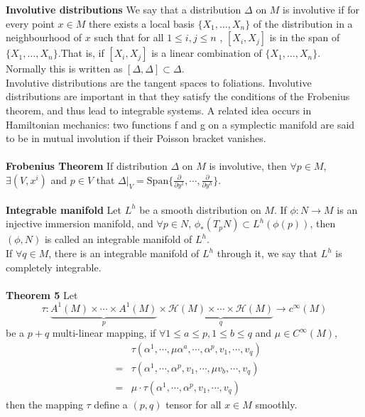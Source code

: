 \documentclass{article}
\begin{document}
\textbf{Involutive distributions} We say that a distribution $\Delta$ on $M$ is involutive if for every point $x \in M$ there exists a local basis $\{X_{1},\ldots ,X_{n}\}$ of the distribution in a neighbourhood of $x$ such that for all $1\leq i,j\leq n$ , $[X_{i},X_{j}]$  is in the span of $\{X_{1},\ldots ,X_{n}\}$.That is, if $[X_{i},X_{j}]$ is a linear combination of $\{X_{1},\ldots ,X_{n}\}$. Normally this is written as $ [\Delta ,\Delta ]\subset \Delta $.\\
Involutive distributions are the tangent spaces to foliations. Involutive distributions are important in that they satisfy the conditions of the Frobenius theorem, and thus lead to integrable systems.
A related idea occurs in Hamiltonian mechanics: two functions f and g on a symplectic manifold are said to be in mutual involution if their Poisson bracket vanishes.\\ \\
\textbf{Frobenius Theorem} If distribution $\Delta$ on $M$ is involutive, then $\forall p \in M$, $\exists (V,x^i)$ and $p \in V$ that $\Delta|_{V} = \mathrm{Span} \{ \frac{\partial}{\partial y^1} , \cdots, \frac{\partial}{\partial y^h}\}$.\\ \\
\textbf{Integrable manifold} Let $L^{h}$ be a smooth distribution on $M$. If $\phi:N \to M$ is an injective immersion manifold, and $\forall p \in N$, $\phi_{*}(T_pN) \subset L^h(\phi(p))$, then $(\phi,N)$ is called an integrable manifold of $L^h$.\\
If $\forall q \in M$, there is an integrable manifold of $L^h$ through it, we say that $L^h$ is completely integrable.\\ \\
\textbf{Theorem 5} Let
\[\tau: \underbrace{A^1(M) \times \cdots \times A^1(M)}_p \times \underbrace{\mathcal{H}(M) \times \cdots \times \mathcal{H}(M)}_q \to c^{\infty}(M)\] 
be a $p+q$ multi-linear mapping, if $\forall 1 \leq a \leq p,1 \leq b \leq q$ and $\mu \in C^{\infty}(M)$,
\begin{eqnarray}
&&\tau(\alpha^1,\cdots,\mu \alpha^{a},\cdots,\alpha^p,v_1,\cdots,v_q)\nonumber \\
&=&\tau(\alpha^1,\cdots,\alpha^p,v_1,\cdots,\mu v_{b},\cdots,v_q)\nonumber \\
&=&\mu \cdot \tau(\alpha^1,\cdots,\alpha^p,v_1,\cdots,v_q)\nonumber
\end{eqnarray}
then the mapping $\tau$ define a $(p,q)$ tensor for all $x \in M$ smoothly.\\ \\
\end{document}
